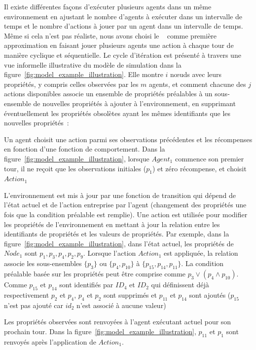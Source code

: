 Il existe différentes façons d'exécuter plusieurs agents dans un même environnement en ajustant le nombre d'agents à exécuter dans un intervalle de temps et le nombre d'actions à jouer par un agent dans un intervalle de temps. Même si cela n'est pas réaliste, nous avons choisi le ~\cite{terry2020pettingzoo} comme première approximation en faisant jouer plusieurs agents une action à chaque tour de manière cyclique et séquentielle. Le cycle d'itération est présenté à travers une vue informelle illustrative du modèle de simulation dans la figure~\ref{fig:model_example_illustration}. Elle montre $i$ nœuds avec leurs propriétés, y compris celles observées par les $m$ agents, et comment chacune des $j$ actions disponibles associe un ensemble de propriétés préalables à un sous-ensemble de nouvelles propriétés à ajouter à l'environnement, en supprimant éventuellement les propriétés obsolètes ayant les mêmes identifiants que les nouvelles propriétés~: \begin{enumerate*}[label=\arabic*),itemjoin={;\quad}]
  \item Un agent choisit une action parmi ses observations précédentes et les récompenses en fonction d'une fonction de comportement. Dans la figure~\ref{fig:model_example_illustration}, lorsque $Agent_1$ commence son premier tour, il ne reçoit que les observations initiales ($p_{1}$) et zéro récompense, et choisit $Action_1$



  \item L'environnement est mis à jour par une fonction de transition qui dépend de l'état actuel et de l'action entreprise par l'agent (changement des propriétés une fois que la condition préalable est remplie). Une action est utilisée pour modifier les propriétés de l'environnement en mettant à jour la relation entre les identifiants de propriétés et les valeurs de propriétés.
  Par exemple, dans la figure~\ref{fig:model_example_illustration}, dans l'état actuel, les propriétés de $Node_1$ sont $p_1,p_3,p_4,p_2,p_9$. Lorsque l'action $Action_1$ est appliquée, la relation associe les sous-ensembles $\{p_3\}$ ou $\{p_4, \allowbreak p_{10}\}$ à $\{p_{15}, \allowbreak p_{14}, \allowbreak p_{11}\}$. La condition préalable basée sur les propriétés peut être comprise comme $p_3 \lor (p_4 \land p_{10})$. Comme $p_{15}$ et $p_{14}$ sont identifiés par $ID_4$ et $ID_2$ qui définissent déjà respectivement $p_{2}$ et $p_{4}$, $p_{4}$ et $p_{2}$ sont supprimés et $p_{11}$ et $p_{14}$ sont ajoutés ($p_{15}$ n'est pas ajouté car $id_2$ n'est associé à aucune valeur)



  \item Les propriétés observées sont renvoyées à l'agent exécutant actuel pour son prochain tour. Dans la figure~\ref{fig:model_example_illustration}, $p_{11}$ et $p_1$ sont renvoyés après l'application de $Action_1$.

\end{enumerate*}

